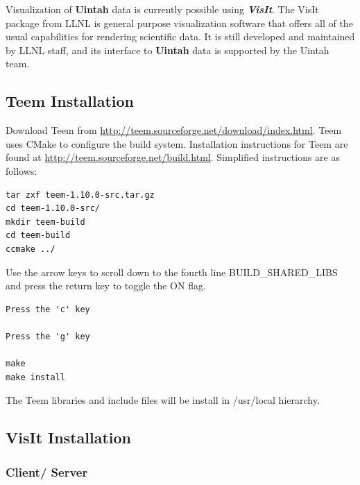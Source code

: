 \documentclass[12pt]{article}
\begin{document}
Visualization of \textbf{Uintah} data is currently possible using
\textbf{\emph{VisIt}}. The VisIt package from LLNL is general purpose
visualization software that offers all of the usual capabilities for
rendering scientific data.  It is still developed and maintained by
LLNL staff, and its interface to \textbf{Uintah} data is supported by
the Uintah team.


\subsection{Teem Installation}
\label{subsec:teem}


Download Teem from
\url{http://teem.sourceforge.net/download/index.html}.  Teem uses
CMake to configure the build system. Installation instructions for
Teem are found at \url{http://teem.sourceforge.net/build.html}.  Simplified
instructions are as follows:

\begin{verbatim}
tar zxf teem-1.10.0-src.tar.gz
cd teem-1.10.0-src/
mkdir teem-build
cd teem-build
ccmake ../
\end{verbatim}

Use the arrow keys to scroll down to the fourth line
BUILD\_SHARED\_LIBS and press the return key to toggle the ON flag.

\begin{verbatim}
Press the 'c' key

Press the 'g' key

make
make install
\end{verbatim}
The Teem libraries and include files will be install in /usr/local hierarchy.

\subsection{VisIt Installation}

\subsubsection{Client/ Server}
\label{subsec:ClientServer}
\end{document}
